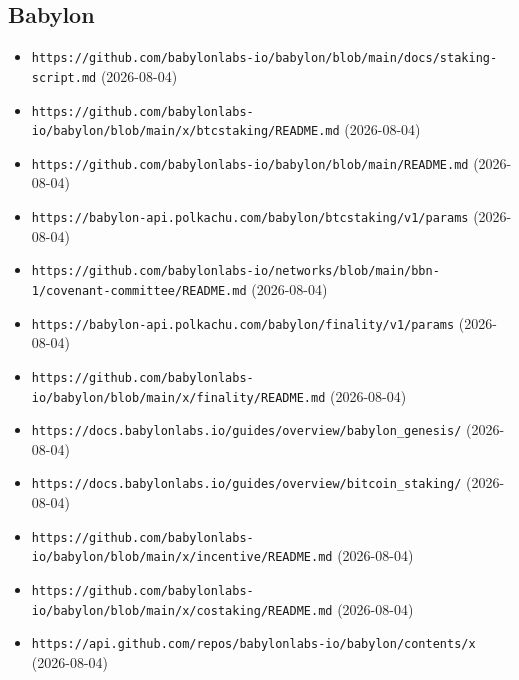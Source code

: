 \subsection*{Babylon}
\begin{itemize}\setlength{\itemsep}{0pt}\small
\item \texttt{https://github.com/babylonlabs-io/babylon/blob/main/docs/staking-script.md} (2026-08-04)
\item \texttt{https://github.com/babylonlabs-io/babylon/blob/main/x/btcstaking/README.md} (2026-08-04)
\item \texttt{https://github.com/babylonlabs-io/babylon/blob/main/README.md} (2026-08-04)
\item \texttt{https://babylon-api.polkachu.com/babylon/btcstaking/v1/params} (2026-08-04)
\item \texttt{https://github.com/babylonlabs-io/networks/blob/main/bbn-1/covenant-committee/README.md} (2026-08-04)
\item \texttt{https://babylon-api.polkachu.com/babylon/finality/v1/params} (2026-08-04)
\item \texttt{https://github.com/babylonlabs-io/babylon/blob/main/x/finality/README.md} (2026-08-04)
\item \texttt{https://docs.babylonlabs.io/guides/overview/babylon\_genesis/} (2026-08-04)
\item \texttt{https://docs.babylonlabs.io/guides/overview/bitcoin\_staking/} (2026-08-04)
\item \texttt{https://github.com/babylonlabs-io/babylon/blob/main/x/incentive/README.md} (2026-08-04)
\item \texttt{https://github.com/babylonlabs-io/babylon/blob/main/x/costaking/README.md} (2026-08-04)
\item \texttt{https://api.github.com/repos/babylonlabs-io/babylon/contents/x} (2026-08-04)
\end{itemize}

